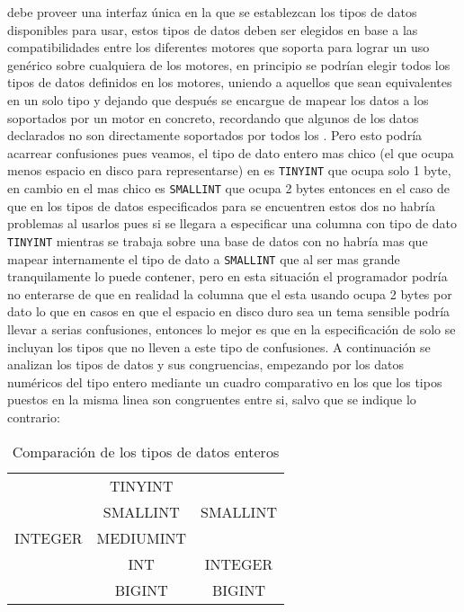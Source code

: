 \jj debe proveer una interfaz única en la que se establezcan los tipos de datos disponibles para usar, estos tipos de datos deben ser elegidos en base a las compatibilidades entre los diferentes motores que soporta para lograr un uso genérico sobre cualquiera de los motores, en principio se podrían elegir todos los tipos de datos definidos en los motores, uniendo a aquellos que sean equivalentes en un solo tipo y dejando que después \cc se encargue de mapear los datos a los soportados por un motor en concreto, recordando que algunos de los datos declarados no son directamente soportados por todos los \dd. Pero esto podría acarrear confusiones pues veamos, el tipo de dato entero mas chico (el que ocupa menos espacio en disco para representarse) en \m\cite{mysql:datatypes} es \verb=TINYINT= que ocupa solo 1 byte, en cambio en \p\cite{postgre:datatypes} el mas chico es \verb=SMALLINT= que ocupa 2 bytes entonces en el caso de que en los tipos de datos especificados para \jj se encuentren estos dos no habría problemas al usarlos pues si se llegara a especificar una columna con tipo de dato \verb=TINYINT= mientras se trabaja sobre una base de datos con \p no habría mas que mapear internamente el tipo de dato a \verb=SMALLINT= que al ser mas grande tranquilamente lo puede contener, pero en esta situación el programador podría no enterarse de que en realidad la columna que el esta usando ocupa 2 bytes por dato lo que en casos en que el espacio en disco duro sea un tema sensible podría llevar a serias confusiones, entonces lo mejor es que en la especificación de \jj solo se incluyan los tipos que no lleven a este tipo de confusiones. A continuación se analizan los tipos de datos y sus congruencias, empezando por los datos numéricos del tipo entero mediante un cuadro comparativo en los que los tipos puestos en la misma linea son congruentes entre si, salvo que se indique lo contrario:
        
\begin{table}[h]
\begin{center}
\begin{tabular}{|c|c|c|}
\hline \s      & \m        & \p \\ 
\hline         & TINYINT   &  \\ 
               & SMALLINT  & SMALLINT \\ 
       INTEGER & MEDIUMINT &  \\
               & INT       & INTEGER \\
               & BIGINT    & BIGINT \\  
\hline 
\end{tabular} 
\end{center}
\caption{Comparación de los tipos de datos enteros}
\end{table}

